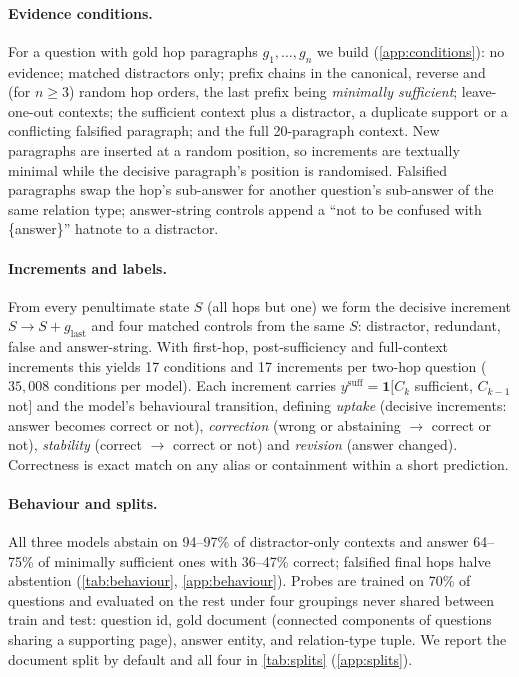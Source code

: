 \paragraph{Evidence conditions.}
For a question with gold hop paragraphs $g_1,\dots,g_n$ we build (\cref{app:conditions}): no evidence; matched distractors only; prefix chains in the canonical, reverse and (for $n\ge3$) random hop orders, the last prefix being \emph{minimally sufficient}; leave-one-out contexts; the sufficient context plus a distractor, a duplicate support or a conflicting falsified paragraph; and the full 20-paragraph context. New paragraphs are inserted at a random position, so increments are textually minimal while the decisive paragraph's position is randomised. Falsified paragraphs swap the hop's sub-answer for another question's sub-answer of the same relation type; answer-string controls append a ``not to be confused with \{answer\}'' hatnote to a distractor.

\paragraph{Increments and labels.}
From every penultimate state $S$ (all hops but one) we form the decisive increment $S\to S{+}g_{\text{last}}$ and four matched controls from the same $S$: distractor, redundant, false and answer-string. With first-hop, post-sufficiency and full-context increments this yields 17 conditions and 17 increments per two-hop question ($35{,}008$ conditions per model). Each increment carries $y^{\mathrm{suff}}=\mathbf 1[C_k$ sufficient, $C_{k-1}$ not$]$ and the model's behavioural transition, defining \emph{uptake} (decisive increments: answer becomes correct or not), \emph{correction} (wrong or abstaining $\to$ correct or not), \emph{stability} (correct $\to$ correct or not) and \emph{revision} (answer changed). Correctness is exact match on any alias or containment within a short prediction.

\paragraph{Behaviour and splits.}
All three models abstain on 94--97\% of distractor-only contexts and answer 64--75\% of minimally sufficient ones with 36--47\% correct; falsified final hops halve abstention (\cref{tab:behaviour}, \cref{app:behaviour}).
Probes are trained on 70\% of questions and evaluated on the rest under four groupings never shared between train and test: question id, gold document (connected components of questions sharing a supporting page), answer entity, and relation-type tuple. We report the document split by default and all four in \cref{tab:splits} (\cref{app:splits}).
